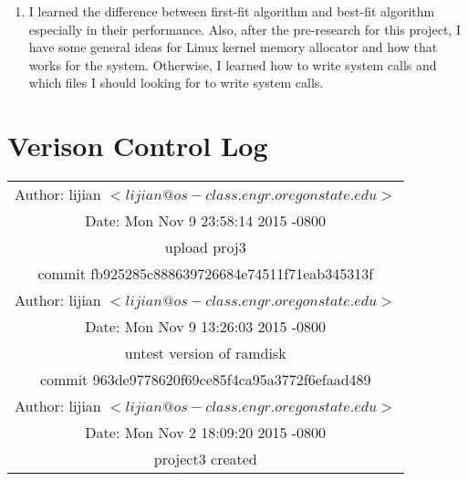 \documentclass[letterpaper,11pt,titlepage]{article}
\begin{document}
\begin{enumerate}
\item I learned the difference between first-fit algorithm and best-fit algorithm especially in their performance. Also, after the pre-research for this project, I have some general ideas for Linux kernel memory allocator and how that works for the system. Otherwise, I learned how to write system calls and which files I should looking for to write system calls. 

\end{enumerate} 


\section{Verison Control Log}

\begin{table}[!hbp]
\begin{tabular}{|c|}

\hline
Author: lijian $<lijian@os-class.engr.oregonstate.edu>$\\
Date:   Mon Nov 9 23:58:14 2015 -0800\\

    upload proj3\\

\hline
commit fb925285c888639726684e74511f71eab345313f\\
Author: lijian $<lijian@os-class.engr.oregonstate.edu>$\\
Date:   Mon Nov 9 13:26:03 2015 -0800\\

    untest version of ramdisk\\

\hline
commit 963de9778620f69ce85f4ca95a3772f6efaad489\\
Author: lijian $<lijian@os-class.engr.oregonstate.edu>$\\
Date:   Mon Nov 2 18:09:20 2015 -0800\\

    project3 created\\

\hline


 
\end{tabular}
\end{table}
\end{document}
